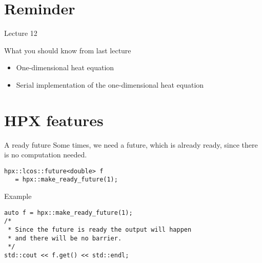 \documentclass[\classoption]{beamer}
\title{\coursename}
\subtitle{Lecture 13: Futurization of the 1D heat equation}
\author{\tiny Patrick Diehl \orcid{0000-0003-3922-8419}}
\date {
 \tiny \url{\courseurl}
\vspace{2cm}
\doclicenseThis  
  
}
\begin{document}
 {
    \frame {
        \titlepage
    }
}

\frame{

\tableofcontents

}


\section{Reminder}
\begin{frame}{Lecture 12}
\begin{block}{What you should know from last lecture}
\begin{itemize}
\item One-dimensional heat equation 
\item Serial implementation of the one-dimensional heat equation
\end{itemize}
\end{block}
\end{frame}

\section{HPX features}

\begin{frame}[fragile]{A ready future}
Some times, we need a future, which is already ready, since there is no computation needed.


\begin{lstlisting}
hpx::lcos::future<double> f 
   = hpx::make_ready_future(1);
\end{lstlisting}

\begin{block}{Example}
\begin{lstlisting}
auto f = hpx::make_ready_future(1);
/* 
 * Since the future is ready the output will happen
 * and there will be no barrier.
 */
std::cout << f.get() << std::endl;
\end{lstlisting}
\end{block}

\end{frame}
\end{document}
